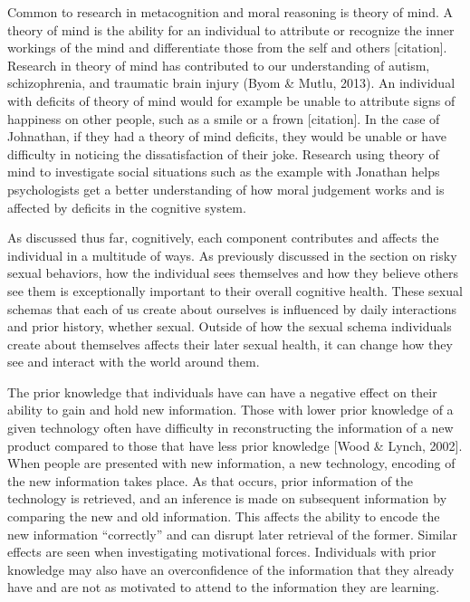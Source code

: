 \documentclass[
  donotrepeattitle,doc, 12pt, a4paper,floatsintext]{apa7}
\begin{document}
Common to research in metacognition and moral reasoning is theory of mind. A theory of mind is the ability for an individual to attribute or recognize the inner workings of the mind and differentiate those from the self and others {[}citation{]}. Research in theory of mind has contributed to our understanding of autism, schizophrenia, and traumatic brain injury (Byom \& Mutlu, 2013). An individual with deficits of theory of mind would for example be unable to attribute signs of happiness on other people, such as a smile or a frown {[}citation{]}. In the case of Johnathan, if they had a theory of mind deficits, they would be unable or have difficulty in noticing the dissatisfaction of their joke. Research using theory of mind to investigate social situations such as the example with Jonathan helps psychologists get a better understanding of how moral judgement works and is affected by deficits in the cognitive system.

As discussed thus far, cognitively, each component contributes and affects the individual in a multitude of ways. As previously discussed in the section on risky sexual behaviors, how the individual sees themselves and how they believe others see them is exceptionally important to their overall cognitive health. These sexual schemas that each of us create about ourselves is influenced by daily interactions and prior history, whether sexual. Outside of how the sexual schema individuals create about themselves affects their later sexual health, it can change how they see and interact with the world around them.

The prior knowledge that individuals have can have a negative effect on their ability to gain and hold new information. Those with lower prior knowledge of a given technology often have difficulty in reconstructing the information of a new product compared to those that have less prior knowledge {[}Wood \& Lynch, 2002{]}. When people are presented with new information, a new technology, encoding of the new information takes place. As that occurs, prior information of the technology is retrieved, and an inference is made on subsequent information by comparing the new and old information. This affects the ability to encode the new information ``correctly'' and can disrupt later retrieval of the former. Similar effects are seen when investigating motivational forces. Individuals with prior knowledge may also have an overconfidence of the information that they already have and are not as motivated to attend to the information they are learning.
\end{document}
